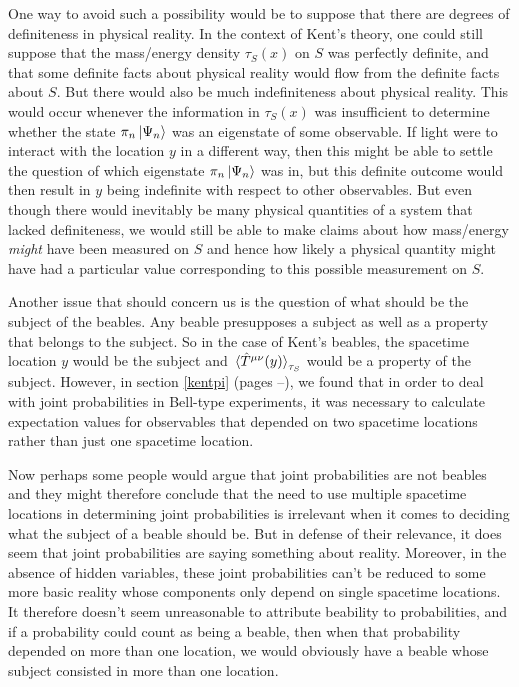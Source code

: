 One way to avoid such a possibility would be to suppose that there are degrees of definiteness in physical reality. In the context of Kent's theory, one could still suppose that the mass/energy density $\tau_S(x)$ on $S$ was perfectly definite, and that some definite facts about physical reality would flow from the definite facts about $S$. But there would also be much indefiniteness about physical reality. This would occur whenever the information in $\tau_S(x)$ was insufficient to determine whether the state $\pi_n\ket{\Psi_n}$ was an eigenstate of some observable. If light were to interact with the location $y$ in a different way, then this might be able to settle the question of which eigenstate $\pi_n\ket{\Psi_n}$ was in, but this definite outcome would then result in $y$ being indefinite with respect to other observables. But even though there would inevitably be many physical quantities of a system that lacked definiteness, we would still be able to make claims about how mass/energy \emph{might} have been measured on $S$ and hence how likely a physical quantity might have had a particular value corresponding to this possible measurement on $S$.

Another issue that should concern us is the question of what should be the  subject of the beables. Any beable presupposes a subject as well as a property that belongs to the subject. So in the case of Kent's beables, the spacetime location $y$ would be the subject and $\ev*{\hat{T}^{\mu\nu}(y)}_{\tau_S}$ would be a property of the subject. However, in section \ref{kentpi} (pages \pageref{kentpi}--\pageref{kentpiend}), we found that in order to deal with joint probabilities in Bell-type experiments, it was necessary to calculate expectation values for observables that depended on two spacetime locations rather than just one spacetime location. 

Now perhaps some people would argue that joint probabilities are not beables and they might therefore conclude that the need to use multiple spacetime locations in determining joint probabilities is irrelevant when it comes to deciding what the subject of a beable should be. But in defense of their relevance, it does seem that joint probabilities are saying something about reality. Moreover, in the absence of hidden variables, these joint probabilities can't be reduced to some more basic reality whose components only depend on  single spacetime locations. It therefore doesn't seem unreasonable to attribute beability to probabilities, and if a probability could count as being a beable, then when that probability depended on more than one location, we would obviously have a beable whose subject consisted in more than one location. 

